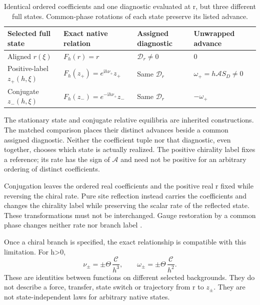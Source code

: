 \documentclass[11pt,a4paper]{article}
\numberwithin{equation}{section}
\theoremstyle{remark}\newtheorem{remark}[theorem]{Remark}
\newcommand{\iu}{\mathrm i}\newcommand{\Id}{I}\newcommand{\Argz}{\operatorname{Arg}_0}
\newcommand{\calA}{\mathcal A}\newcommand{\calC}{\mathcal C}\newcommand{\Cbar}{\overline{\mathcal C}}
\begin{document}
\begin{table}[htbp]\centering\small
\begin{tabularx}{\textwidth}{@{}>{\raggedright\arraybackslash}p{}Y>{\raggedright\arraybackslash}p{.18\textwidth}>{\raggedright\arraybackslash}p{.19\textwidth}@{}}\toprule
Selected full state & Exact native relation & Assigned diagnostic & Unwrapped advance\\\midrule
Aligned $r(\xi)$ & $F_h(r)=r$ & $\mathscr D_r\ne0$ & $0$\\[8pt]
Positive-label $z_+(h,\xi)$ & $F_h(z_+)=e^{\iu h\nu_+}z_+$ & Same $\mathscr D_r$ & $\omega_+=h\calA S_D\ne0$\\[8pt]
Conjugate $z_-(h,\xi)$ & $F_h(z_-)=e^{-\iu h\nu_+}z_-$ & Same $\mathscr D_r$ & $-\omega_+$\\\bottomrule
\end{tabularx}
\caption{Identical ordered coefficients and one diagnostic evaluated at r, but three different full states. Common-phase rotations of each state preserve its listed advance.}\label{tab:states}
\end{table}

The stationary state and conjugate relative equilibria are inherited constructions. The matched comparison places their distinct advances beside a common assigned diagnostic. Neither the coefficient tuple nor that diagnostic, even together, chooses which state is actually realized. The positive chirality label fixes a reference; its rate has the sign of $\calA$ and need not be positive for an arbitrary ordering of distinct coefficients.

Conjugation leaves the ordered real coefficients and the positive real r fixed while reversing the chiral rate. Pure site reflection instead carries the coefficients and changes the chirality label while preserving the scalar rate of the reflected state. These transformations must not be interchanged. Gauge restoration by a common phase changes neither rate nor branch label \cite[D28--D30]{drift}.

Once a chiral branch is specified, the exact relationship is compatible with this limitation. For h>0,
\begin{equation}
\nu_\pm=\pm\Theta\,\frac{\calC}{h^3},
\qquad \omega_\pm=\pm\Theta\,\frac{\calC}{h^2}.
\label{eq:conditioned}
\end{equation}
These are identities between functions on different selected backgrounds. They do not describe a force, transfer, state switch or trajectory from r to $z_\pm$. They are not state-independent laws for arbitrary native states.
\end{document}
